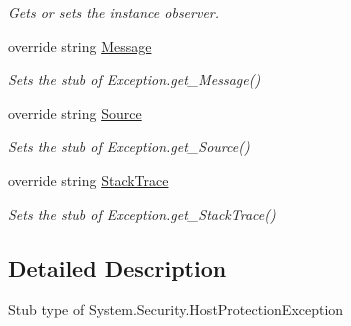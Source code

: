 \begin{DoxyCompactItemize}
\begin{DoxyCompactList}\small\item\em Gets or sets the instance observer.\end{DoxyCompactList}\item 
override string \hyperlink{class_system_1_1_security_1_1_fakes_1_1_stub_host_protection_exception_aeb4374e5888c91ac1ebd3f3a0ea705e0}{Message}
\begin{DoxyCompactList}\small\item\em Sets the stub of Exception.\-get\-\_\-\-Message()\end{DoxyCompactList}\item 
override string \hyperlink{class_system_1_1_security_1_1_fakes_1_1_stub_host_protection_exception_a8e62140d1579b3f4f2a188ffd554d0bf}{Source}
\begin{DoxyCompactList}\small\item\em Sets the stub of Exception.\-get\-\_\-\-Source()\end{DoxyCompactList}\item 
override string \hyperlink{class_system_1_1_security_1_1_fakes_1_1_stub_host_protection_exception_a28a3b48b18d39c5eb5a4a3e6bd64f8c3}{Stack\-Trace}
\begin{DoxyCompactList}\small\item\em Sets the stub of Exception.\-get\-\_\-\-Stack\-Trace()\end{DoxyCompactList}\end{DoxyCompactItemize}


\subsection{Detailed Description}
Stub type of System.\-Security.\-Host\-Protection\-Exception



